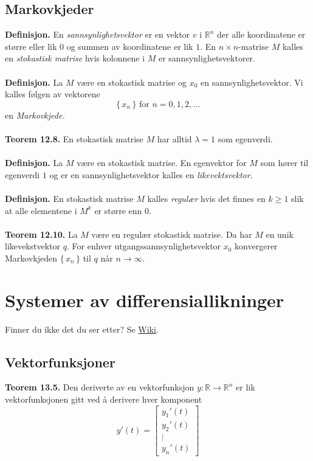 \documentclass{article}
\begin{document}
\subsection{Markovkjeder}
\textbf{Definisjon.} En \textit{sannsynlighetsvektor} er en vektor $v$ i $\mathbb{R}^n$ der alle koordinatene er større eller lik $0$ og summen av koordinatene er lik $1$. En $n \times n$-matrise $M$ kalles en \textit{stokastisk matrise} hvis kolonnene i $M$ er sannsynlighetsvektorer.
\\\\
\textbf{Definisjon.} La $M$ være en stokastisk matrise og $x_0$ en sannsynlighetsvektor. Vi kalles følgen av vektorene
\[ \{\, x_n \,\} \text{ for } n = 0, 1, 2, \dots \]
en \textit{Markovkjede.}
\\\\
\textbf{Teorem 12.8.} En stokastisk matrise $M$ har alltid $\lambda = 1$ som egenverdi.
\\\\
\textbf{Definisjon.} La $M$ være en stokastisk matrise. En egenvektor for $M$ som hører til egenverdi $1$ og er en sannsynlighetsvektor kalles en \textit{likevektsvektor}.
\\\\
\textbf{Definisjon.} En stokastisk matrise $M$ kalles \textit{regulær} hvis det finnes en $k \geq 1$ slik at alle elementene i $M^k$ er større enn 0.
\\\\
\textbf{Teorem 12.10.} La $M$ være en regulær stokastisk matrise. Da har $M$ en unik likevekstvektor $q$. For enhver utgangssannsynlighetsvektor $x_0$ konvergerer Markovkjeden $\{\, x_n \,\}$ til $q$ når $n \rightarrow \infty$.




\clearpage
\section{Systemer av differensiallikninger}
Finner du ikke det du ser etter? Se \href{https://www.math.ntnu.no/emner/TMA4110/2020h/notater/13-system.pdf}{Wiki}.


\subsection{Vektorfunksjoner}
\textbf{Teorem 13.5.} Den deriverte av en vektorfunksjon $y: \mathbb{R} \rightarrow \mathbb{R}^n$ er lik vektorfunksjonen gitt ved å derivere hver komponent
\[ y'(t) = \begin{bmatrix}
    y_1'(t) \\ y_2'(t) \\ \vdots \\ y_n'(t)
\end{bmatrix} \]
\end{document}
